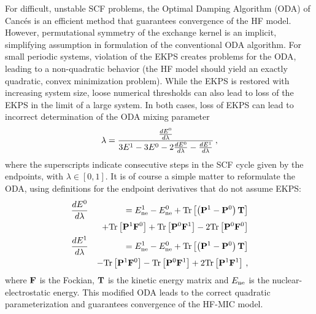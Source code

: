 \documentclass[prb,aps,nobibnotes,twocolumn,doublespace,twocolumngrid,superbib,showpacs]{revtex4}
\begin{document}
For difficult, unstable SCF problems, the Optimal Damping Algorithm (ODA) of Canc{\'e}s \cite{ECances00} is
an efficient method that guarantees convergence of the HF model.  
However,  permutational symmetry of the exchange kernel is an implicit, simplifying assumption in formulation
of the conventional ODA algorithm.   For small periodic systems, violation of the EKPS creates problems
for the ODA, leading to a non-quadratic behavior (the HF model should yield an exactly quadratic, convex 
minimization problem).   While the EKPS is restored with increasing system size, loose numerical thresholds
can also lead to loss of the EKPS in the limit of a large system.  
In both cases, loss of EKPS can lead to incorrect determination of the ODA mixing parameter
%
\begin{eqnarray}
\lambda = {{\frac{d E^0}{d \lambda}} \over {3E^1-3E^0-2{\frac{d E^0}{d \lambda}}-{\frac{d E^1}{d \lambda}}}} \, ,
\end{eqnarray}
%
where the superscripts indicate consecutive steps in the SCF cycle given by the endpoints, 
with $\lambda \in [0,1]$.   It is of course a simple matter to reformulate the ODA, using definitions 
for the endpoint derivatives that do not assume EKPS:
\begin{eqnarray}
\frac{d E^0}{d \lambda} &&=  E^{1}_{\rm ne}-E^{0}_{\rm ne}  
+{\rm Tr}\left[\left( {\bf P}^1 - {\bf P}^0 \right) {\bf T}  \right]\nonumber\\
&& +{\rm Tr}\left[ {\bf P}^1 {\bf F}^0 \right] 
   +{\rm Tr}\left[ {\bf P}^0 {\bf F}^1 \right] 
   -2 {\rm Tr}\left[ {\bf P}^0 {\bf F}^0 \right] \nonumber\\
\frac{d E^1}{d \lambda} &&=  E^{1}_{\rm ne}-E^{0}_{\rm ne}  
+{\rm Tr}\left[\left( {\bf P}^1 - {\bf P}^0 \right) {\bf T}  \right]\nonumber\\
&& -{\rm Tr}\left[ {\bf P}^1 {\bf F}^0 \right] 
   -{\rm Tr}\left[ {\bf P}^0 {\bf F}^1 \right] 
   +2 {\rm Tr}\left[ {\bf P}^1 {\bf F}^1 \right] \, , \nonumber\\
\end{eqnarray}
where  ${\bf F}$ is the Fockian, ${\bf T}$ is the kinetic energy matrix  and $E_{\rm ne}$ is the nuclear-electrostatic energy.
This  modified ODA leads to the correct quadratic parameterization and guarantees convergence of the HF-MIC model.  
\end{document}
